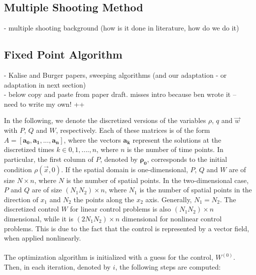 \documentclass[11pt, a4paper]{article}
\theoremstyle{definition}
\newcommand{\adj}{q}
\begin{document}
\subsection{Multiple Shooting Method}
- multiple shooting background (how is it done in literature, how do we do it)
\subsection{Fixed Point Algorithm}
- Kalise and Burger papers, sweeping algorithms (and our adaptation - or adaptation in next section)\\
- below copy and paste from paper draft. misses intro because ben wrote it -- need to write my own! ++

In the following, we denote the discretized versions of the variables $\rho$, $\adj$ and $\vec{w}$ with $P$, $Q$ and $W$, respectively. Each of these matrices is of the form $A = [\boldsymbol{a_0}, \boldsymbol{a_1}, ... ,\boldsymbol{a_n}]$, where the vectors $\boldsymbol{a_k}$ represent the solutions at the discretized times $k \in 0,1,....,n$, where $n$ is the number of time points. In particular, the first column of $P$, denoted by $\boldsymbol{\rho_0}$, corresponds to the initial condition $\rho(\vec{x},0)$. If the spatial domain is one-dimensional, $P$, $Q$ and $W$ are of size $N \times n$, where $N$ is the number of spatial points. In the two-dimensional case, $P$ and $Q$ are of size $(N_1N_2) \times n$, where $N_1$ is the number of spatial points in the direction of $x_1$ and $N_2$ the points along the $x_2$ axis. Generally, $N_1 = N_2$. The discretized control $W$ for linear control problems is also $(N_1N_2) \times n$ dimensional, while it is $(2N_1N_2) \times n$ dimensional for nonlinear control problems. This is due to the fact that the control is represented by a vector field, when applied nonlinearly.
\\
\\
The optimization algorithm is initialized with a guess for the control, $W^{(0)}$. Then, in each iteration, denoted by $i$, the following steps are computed:
\vspace{0.1cm}
\end{document}
